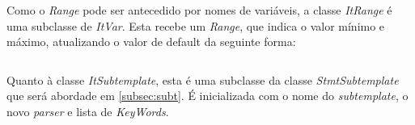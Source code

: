 \documentclass[../relatorio.tex]{subfiles}
\begin{document}
    Como o \textit{Range} pode ser antecedido por nomes de variáveis, a classe
    \textit{ItRange} é uma subclasse de \textit{ItVar}. Esta recebe um \textit{Range},
    que indica o valor mínimo e máximo, atualizando o valor de default da seguinte forma:
    
    \inputminted[firstline=9, lastline=20]{python}{../modules/It/ItRange.py}

    Quanto à classe \textit{ItSubtemplate}, esta é uma subclasse da classe \textit{StmtSubtemplate}
    que será abordade em \ref{subsec:subt}. É inicializada com o nome do \textit{subtemplate},
    o novo \textit{parser} e lista de \textit{KeyWords}.

    
    
     
\end{document}
